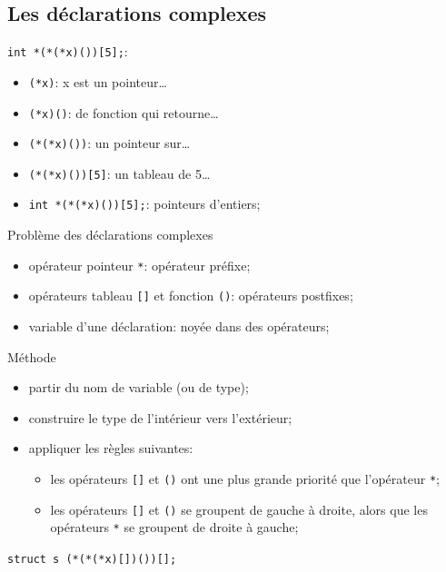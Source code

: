 \begin{frame}
    \section{Les d\'eclarations complexes}

 {\tt int *(*(*x)())[5];}: 
\begin{itemize}
  \item {\tt (*x)}: x est un pointeur\ldots
  \item {\tt (*x)()}: de fonction qui retourne\ldots
  \item {\tt (*(*x)())}: un pointeur sur\ldots
  \item {\tt (*(*x)())[5]}: un tableau de 5\ldots
  \item {\tt int *(*(*x)())[5];}: pointeurs d'entiers;
\end{itemize}

 Probl\`eme des d\'eclarations complexes
\begin{itemize}
  \item op\'erateur pointeur \verb?*?: op\'erateur pr\'efixe;
  \item op\'erateurs tableau {\tt []} et fonction {\tt ()}: op\'erateurs
    postfixes;
  \item variable d'une d\'eclaration: noy\'ee dans des op\'erateurs;  
\end{itemize}
\end{frame}
\begin{frame}
  M\'ethode
\begin{itemize}
  \item partir du nom de variable (ou de type);
  \item construire le type de l'int\'erieur vers l'ext\'erieur;
  \item appliquer les r\`egles suivantes:
    \begin{itemize}
      \item les op\'erateurs {\tt []} et {\tt ()} ont une plus grande
        priorit\'e que l'op\'erateur \verb?*?;

      \item les op\'erateurs {\tt []} et {\tt ()} se groupent de gauche
        \`a droite, alors que les op\'erateurs \verb?*? se groupent de
        droite \`a gauche; 
    \end{itemize}
\end{itemize}

 {\tt struct s (*(*(*x)[])())[];}


\end{frame}


